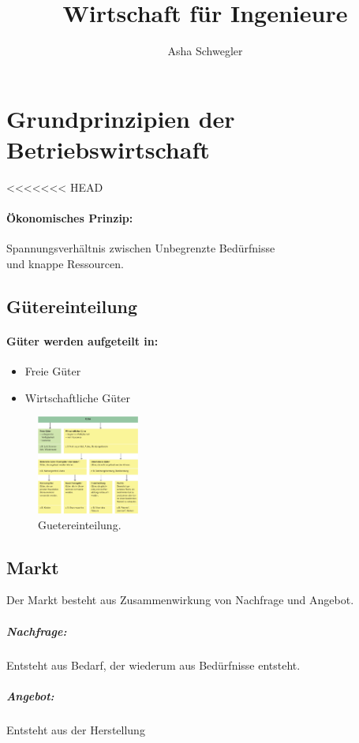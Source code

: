 \documentclass{article}
\title{Wirtschaft für Ingenieure}
\author{Asha Schwegler}
\begin{document}
\maketitle
\tableofcontents
\pagebreak

\section{Grundprinzipien der Betriebswirtschaft}


<<<<<<< HEAD
\paragraph{Ökonomisches Prinzip:}
Spannungsverhältnis zwischen Unbegrenzte Bedürfnisse\\
und knappe Ressourcen.

\subsection{Gütereinteilung}
\paragraph{Güter werden aufgeteilt in:}

\begin{itemize}
\item Freie Güter
\item Wirtschaftliche Güter
\end{itemize}

\begin{figure}[H]
\centering
\includegraphics[width=0.3\textwidth]{Resources/Image/Guetereinteilung.png}
\caption{\label{fig:Guetereinteilung}Guetereinteilung.}
\end{figure}


\subsection{Markt}
Der Markt besteht aus Zusammenwirkung von Nachfrage und Angebot. \\
\subparagraph{Nachfrage:} Entsteht aus Bedarf, der wiederum aus Bedürfnisse entsteht.
\subparagraph{Angebot:} 
Entsteht aus der Herstellung
\end{document}
